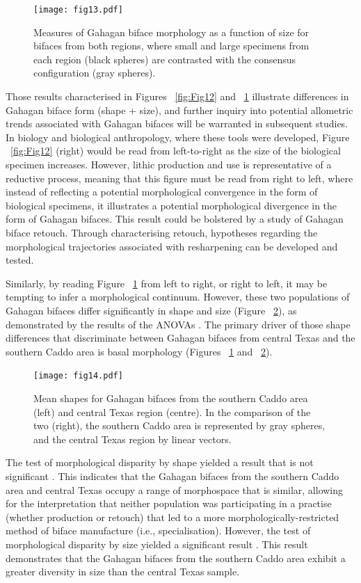 \documentclass[review]{elsarticle}
\begin{document}
\begin{figure}[h!]\centering
\texttt{[image: fig13.pdf]}
\caption{Measures of Gahagan biface morphology as a function of size for bifaces from both regions, where small and large specimens from each region (black spheres) are contrasted with the consensus configuration (gray spheres).}
\label{fig:Fig13}
\end{figure}

Those results characterised in Figures ~\ref{fig:Fig12} and ~\ref{fig:Fig13} illustrate differences in Gahagan biface form (shape + size), and further inquiry into potential allometric trends associated with Gahagan bifaces will be warranted in subsequent studies. In biology and biological anthropology, where these tools were developed, Figure ~\ref{fig:Fig12} (right) would be read from left-to-right as the size of the biological specimen increases. However, lithic production and use is representative of a reductive process, meaning that this figure must be read from right to left, where instead of reflecting a potential morphological convergence in the form of biological specimens, it illustrates a potential morphological divergence in the form of Gahagan bifaces. This result could be bolstered by a study of Gahagan biface retouch. Through characterising retouch, hypotheses regarding the morphological trajectories associated with resharpening can be developed and tested.

Similarly, by reading Figure ~\ref{fig:Fig13} from left to right, or right to left, it may be tempting to infer a morphological continuum. However, these two populations of Gahagan bifaces differ significantly in shape and size (Figure ~\ref{fig:Fig14}), as demonstrated by the results of the ANOVAs \citep{RN20850}. The primary driver of those shape differences that discriminate between Gahagan bifaces from central Texas and the southern Caddo area is basal morphology (Figures ~\ref{fig:Fig13} and ~\ref{fig:Fig14}).

\begin{figure}[h!]\centering
\texttt{[image: fig14.pdf]}
\caption{Mean shapes for Gahagan bifaces from the southern Caddo area (left) and central Texas region (centre). In the comparison of the two (right), the southern Caddo area is represented by gray spheres, and the central Texas region by linear vectors.}
\label{fig:Fig14}
\end{figure}

The test of morphological disparity by shape yielded a result that is not significant \citep{RN20850}. This indicates that the Gahagan bifaces from the southern Caddo area and central Texas occupy a range of morphospace that is similar, allowing for the interpretation that neither population was participating in a practise (whether production or retouch) that led to a more morphologically-restricted method of biface manufacture (i.e., specialisation). However, the test of morphological disparity by size yielded a significant result \citep{RN20850}. This result demonstrates that the Gahagan bifaces from the southern Caddo area exhibit a greater diversity in size than the central Texas sample.
\end{document}
